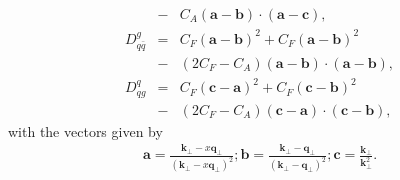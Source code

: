 \documentclass[aps, prc, reprint, amsmath, groupedaddress, nofootinbib]{revtex4-1}
\begin{document}
\begin{appendices}
\begin{eqnarray}
&-& C_A (\mathbf{a}-\mathbf{b})\cdot (\mathbf{a}-\mathbf{c}),
\\
D_{q\bar{q}}^{g} &=& 
C_F(\mathbf{a}-\mathbf{b})^2 + C_F(\mathbf{a}-\mathbf{b})^2 \\\nonumber
&-& (2C_F-C_A) (\mathbf{a}-\mathbf{b})\cdot (\mathbf{a}-\mathbf{b}),
\\
D_{qg}^{q} &=& 
C_F(\mathbf{c}-\mathbf{a})^2 + C_F(\mathbf{c}-\mathbf{b})^2 \\\nonumber
&-& (2C_F-C_A) (\mathbf{c}-\mathbf{a})\cdot (\mathbf{c}-\mathbf{b}),
\end{eqnarray}
with the vectors given by
\begin{eqnarray}
\mathbf{a} = \frac{\mathbf{k}_\perp - x\mathbf{q}_\perp}{(\mathbf{k}_\perp - x\mathbf{q}_\perp)^2};
\mathbf{b} = \frac{\mathbf{k}_\perp - \mathbf{q}_\perp}{(\mathbf{k}_\perp - \mathbf{q}_\perp)^2};
\mathbf{c} =  \frac{\mathbf{k}_\perp}{\mathbf{k}_\perp^2}.
\end{eqnarray}


\end{appendices}
\end{document}

